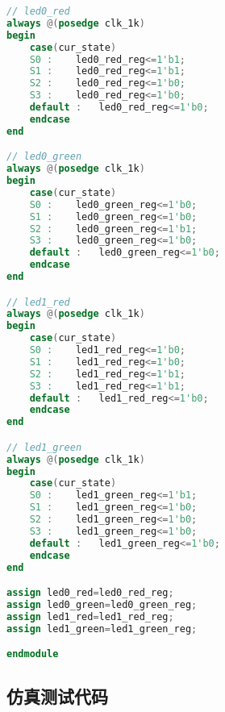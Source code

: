 \documentclass[12pt,AutoFakeBold]{article}
\begin{document}
\begin{lstlisting}[language=Verilog]
// led0_red
always @(posedge clk_1k) 
begin
	case(cur_state)
	S0 : 	led0_red_reg<=1'b1;
	S1 : 	led0_red_reg<=1'b1;
	S2 : 	led0_red_reg<=1'b0;
	S3 : 	led0_red_reg<=1'b0;
	default : 	led0_red_reg<=1'b0;
	endcase
end

// led0_green
always @(posedge clk_1k) 
begin
	case(cur_state)
	S0 : 	led0_green_reg<=1'b0;
	S1 : 	led0_green_reg<=1'b0;
	S2 : 	led0_green_reg<=1'b1;
	S3 : 	led0_green_reg<=1'b0;
	default : 	led0_green_reg<=1'b0;
	endcase
end

// led1_red
always @(posedge clk_1k) 
begin
	case(cur_state)
	S0 : 	led1_red_reg<=1'b0;
	S1 : 	led1_red_reg<=1'b0;
	S2 : 	led1_red_reg<=1'b1;
	S3 : 	led1_red_reg<=1'b1;
	default : 	led1_red_reg<=1'b0;
	endcase
end

// led1_green
always @(posedge clk_1k) 
begin
	case(cur_state)
	S0 : 	led1_green_reg<=1'b1;
	S1 : 	led1_green_reg<=1'b0;
	S2 : 	led1_green_reg<=1'b0;
	S3 : 	led1_green_reg<=1'b0;
	default : 	led1_green_reg<=1'b0;
	endcase
end

assign led0_red=led0_red_reg;
assign led0_green=led0_green_reg;
assign led1_red=led1_red_reg;
assign led1_green=led1_green_reg;

endmodule
\end{lstlisting}

\subsection{仿真测试代码}
\end{document}
